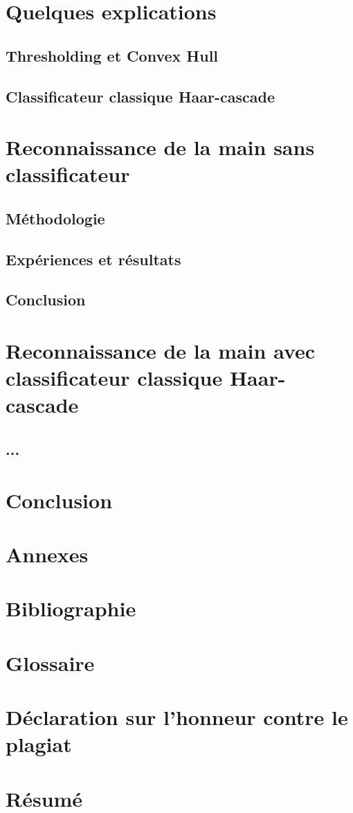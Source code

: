 \documentclass[11pt]{article}
\begin{document}
\section{Quelques explications}
\subsection{Thresholding et Convex Hull}
\subsection{Classificateur classique Haar-cascade}
\newpage

\section{Reconnaissance de la main sans classificateur}
\subsection{Méthodologie}
\subsection{Expériences et résultats}
\subsection{Conclusion}
\newpage

\section{Reconnaissance de la main avec classificateur classique Haar-cascade}
\subsection{...}

\section*{Conclusion}
\newpage

\section*{Annexes}

\section*{Bibliographie}
\newpage

\section*{Glossaire}

\section*{Déclaration sur l'honneur contre le plagiat}

\newpage

\newpage
\section*{Résumé}
\end{document}
